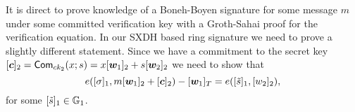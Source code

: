 It is direct to prove knowledge of a Boneh-Boyen signature for some message $m$ under some committed verification key with a Groth-Sahai proof for the verification equation. In our SXDH based ring signature we need to prove a slightly different statement. Since we have a commitment to the secret key $[{\boldsymbol{c}}]_{2} = \mathsf{Com}_{ck_2}(x;s) = x[{\boldsymbol{w}}_1]_2+s[{\boldsymbol{w}}_2]_2$ we need to show that
\begin{equation}
e([{\sigma}]_1, m[{\boldsymbol{w}}_1]_2 + [{\boldsymbol{c}}]_2) - [{\boldsymbol{w}}_1]_T= e([\tilde{s}]_1,[w_2]_2),
\label{eq:bbs-verification}
\end{equation}
for some $[\tilde{s}]_1\in\mathbb{G}_1$.
